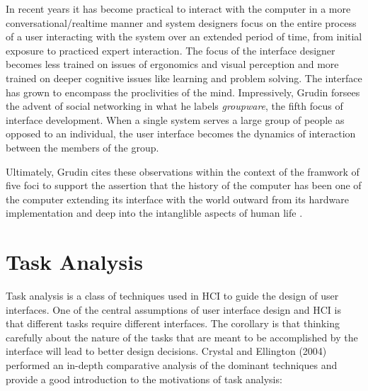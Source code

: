 In recent years it has become practical to interact with the computer in a more conversational/realtime manner and system designers focus on the entire process of a user interacting with the system over an extended period of time, from initial exposure to practiced expert interaction. The focus of the interface designer becomes less trained on issues of ergonomics and visual perception and more trained on deeper cognitive issues like learning and problem solving. The interface has grown to encompass the proclivities of the mind. Impressively, Grudin forsees the advent of social networking in what he labels \emph{groupware}, the fifth focus of interface development. When a single system serves a large group of people as opposed to an individual, the user interface becomes the dynamics of interaction between the members of the group.

Ultimately, Grudin cites these observations within the context of the framwork of five foci to support the assertion that the history of the computer has been one of the computer extending its interface with the world outward from its hardware implementation and deep into the intanglible aspects of human life \cite{continuity1990}.

\section{Task Analysis}

Task analysis is a class of techniques used in HCI to guide the design of user interfaces. One of the central assumptions of user interface design and HCI is that different tasks require different interfaces. The corollary is that thinking carefully about the nature of the tasks that are meant to be accomplished by the interface will lead to better design decisions. Crystal and Ellington (2004) performed an in-depth comparative analysis of the dominant techniques and provide a good introduction to the motivations of task analysis:

